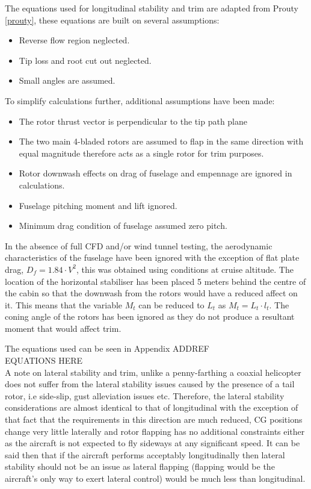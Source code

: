 \documentclass[11pt,a4paper]{article}
\begin{document}
The equations used for longitudinal stability and trim are adapted from Prouty \ref{prouty}, these equations are built on several assumptions:

\begin{itemize}
    \item Reverse flow region neglected.
    \item Tip loss and root cut out neglected.
    \item Small angles are assumed.
\end{itemize}{}

To simplify calculations further, additional assumptions have been made:

\begin{itemize}
    \item The rotor thrust vector is perpendicular to the tip path plane
    \item The two main 4-bladed rotors are assumed to flap in the same direction with equal magnitude therefore acts as a single rotor for trim purposes.
    \item Rotor downwash effects on drag of fuselage and empennage are ignored in calculations.
    \item Fuselage pitching moment and lift ignored.
    \item Minimum drag condition of fuselage assumed zero pitch.
\end{itemize}{}

In the absence of full CFD and/or wind tunnel testing, the aerodynamic characteristics of the fuselage have been ignored with the exception of flat plate drag, $D_f=1.84\cdot V^2$, this was obtained using conditions at cruise altitude.
The location of the horizontal stabiliser has been placed 5 meters behind the centre of the cabin so that the downwash from the rotors would have a reduced affect on it. This means that the variable $M_t$ can be reduced to $L_t$ as $M_t=L_t\cdot l_t$. The coning angle of the rotors has been ignored as they do not produce a resultant moment that would affect trim.

The equations used can be seen in Appendix ADDREF\\

EQUATIONS HERE\\

A note on lateral stability and trim, unlike a penny-farthing a coaxial helicopter does not suffer from the lateral stability issues caused by the presence of a tail rotor, i.e side-slip, gust alleviation issues etc. Therefore, the lateral stability considerations are almost identical to that of longitudinal with the exception of that fact that the requirements in this direction are much reduced, CG positions change very little laterally and rotor flapping has no additional constraints either as the aircraft is not expected to fly sideways at any significant speed.
It can be said then that if the aircraft performs acceptably longitudinally then lateral stability should not be an issue as lateral flapping (flapping would be the aircraft's only way to exert lateral control) would be much less than longitudinal.
\end{document}
